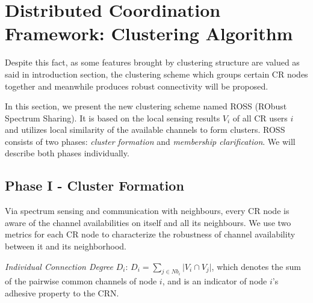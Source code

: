 \section{Distributed Coordination Framework: Clustering Algorithm}
\label{ross}
Despite this fact, as some features brought by clustering structure are valued as said in introduction section, the clustering scheme which groups certain CR nodes together and meanwhile produces robust connectivity will be proposed.



In this section, we present the new clustering scheme named ROSS (RObust Spectrum Sharing). It is based on the local sensing results $V_{i}$ of all CR users $i$ and utilizes local similarity of the available channels to form clusters. ROSS consists of two phases: \textit{cluster formation} and \textit{membership clarification}. We will describe both phases individually.

\subsection{Phase I - Cluster Formation}
Via spectrum sensing and communication with neighbours, every CR node is aware of the channel availabilities on itself and all its neighbours.
We use two metrics for each CR node to characterize the robustness of channel availability between it and its neighborhood.

\textit{Individual Connection Degree} $D_i$: $D_i=\sum_{j\in Nb_i}\vert V_i\cap V_j\vert$, which denotes the sum of the pairwise common channels of node $i$, and is an indicator of node $i$'s adhesive property to the CRN. 

